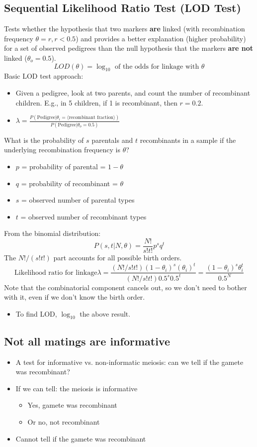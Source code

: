 \documentclass[10pt]{article}
\begin{document}
\subsection*{Sequential Likelihood Ratio Test (LOD Test)}
Tests whether the hypothesis that two markers \textbf{are} linked (with recombination frequency $\theta = r, r < 0.5$) and provides a better explanation (higher probability) for a set of observed pedigrees than the null hypothesis that the markers \textbf{are not} linked ($\theta_o = 0.5$).
\[LOD(\theta) = \log_{10} \text{ of the odds for linkage with } \theta\]
Basic LOD test approach:
\begin{itemize}
	\item Given a pedigree, look at two parents, and count the number of recombinant children.  E.g., in 5 children, if 1 is recombinant, then $r = 0.2$.
    \item $\lambda = \frac{P(\text{Pedigree} | \theta_i = \langle \text{recombinant fraction}\rangle)}{P(\text{Pedigree} | \theta_o = 0.5)}$
\end{itemize}
What is the probability of $s$ parentals and $t$ recombinants in a sample if the underlying recombination frequency is $\theta$?
\begin{itemize}
	\item $p$ = probability of parental = $1 - \theta$
	\item $q$ = probability of recombinant = $\theta$
	\item $s$ = observed number of parental types
	\item $t$ = observed number of recombinant types
\end{itemize}
From the binomial distribution:
\[P(s, t | N, \theta) = \frac{N!}{s!t!} p^s q^t\]
The $N! / (s!t!)$ part accounts for all possible birth orders.
\[\text{Likelihood ratio for linkage}\lambda = \frac{(N! / s!t!) (1 - \theta_i)^s (\theta_i)^t}{(N! / s!t!) 0.5^s 0.5^t} = \frac{(1 - \theta_i)^s \theta_i^t}{0.5^N}\]
Note that the combinatorial component cancels out, so we don't need to bother with it, even if we don't know the birth order.
\begin{itemize}
	\item To find LOD, $\log_10$ the above result.
\end{itemize}

\subsection*{Not all matings are informative}
\begin{itemize}
	\item A test for informative vs. non-informatic meiosis: can we tell if the gamete was recombinant?
	\item If we can tell: the meiosis is informative
	\begin{itemize}
	    \item Yes, gamete was recombinant
	    \item Or no, not recombinant
    \end{itemize}
    \item Cannot tell if the gamete was recombinant
\end{itemize}
\end{document}
